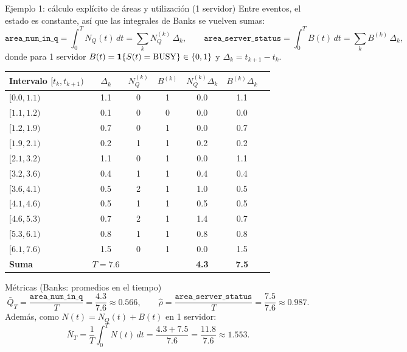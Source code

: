 \documentclass[aspectratio=1610, 9pt]{beamer}
\begin{document}
\begin{frame}{Ejemplo 1: cálculo explícito de áreas y utilización (1 servidor)}
\small
Entre eventos, el estado es constante, así que las integrales de Banks se vuelven sumas:
\[
\texttt{area\_num\_in\_q}=\int_0^T N_Q(t)\,dt=\sum_k N_Q^{(k)}\,\Delta_k,\qquad
\texttt{area\_server\_status}=\int_0^T B(t)\,dt=\sum_k B^{(k)}\,\Delta_k,
\]
donde para 1 servidor $B(t)=\mathbf{1}\{S(t)=\text{BUSY}\}\in\{0,1\}$ y $\Delta_k=t_{k+1}-t_k$.

\tiny
\setlength{\tabcolsep}{2.6pt}
\renewcommand{\arraystretch}{1.12}
\begin{table}
\centering
\begin{tabular}{@{}lcccccc@{}}
\toprule
Intervalo $[t_k,t_{k+1})$ & $\Delta_k$ & $N_Q^{(k)}$ & $B^{(k)}$ &
$N_Q^{(k)}\Delta_k$ & $B^{(k)}\Delta_k$\\
\midrule
$[0.0,1.1)$ & 1.1 & 0 & 1 & 0.0 & 1.1\\
$[1.1,1.2)$ & 0.1 & 0 & 0 & 0.0 & 0.0\\
$[1.2,1.9)$ & 0.7 & 0 & 1 & 0.0 & 0.7\\
$[1.9,2.1)$ & 0.2 & 1 & 1 & 0.2 & 0.2\\
$[2.1,3.2)$ & 1.1 & 0 & 1 & 0.0 & 1.1\\
$[3.2,3.6)$ & 0.4 & 1 & 1 & 0.4 & 0.4\\
$[3.6,4.1)$ & 0.5 & 2 & 1 & 1.0 & 0.5\\
$[4.1,4.6)$ & 0.5 & 1 & 1 & 0.5 & 0.5\\
$[4.6,5.3)$ & 0.7 & 2 & 1 & 1.4 & 0.7\\
$[5.3,6.1)$ & 0.8 & 1 & 1 & 0.8 & 0.8\\
$[6.1,7.6)$ & 1.5 & 0 & 1 & 0.0 & 1.5\\
\midrule
\textbf{Suma} & \textbf{$T=7.6$} &  &  & \textbf{4.3} & \textbf{7.5}\\
\bottomrule
\end{tabular}
\end{table}

\scriptsize
\begin{block}{Métricas (Banks: promedios en el tiempo)}
\[
\bar Q_T=\frac{\texttt{area\_num\_in\_q}}{T}=\frac{4.3}{7.6}\approx 0.566,
\qquad
\hat\rho=\frac{\texttt{area\_server\_status}}{T}=\frac{7.5}{7.6}\approx 0.987.
\]
Además, como $N(t)=N_Q(t)+B(t)$ en 1 servidor:
\[
\bar N_T=\frac{1}{T}\int_0^T N(t)\,dt=\frac{4.3+7.5}{7.6}=\frac{11.8}{7.6}\approx 1.553.
\]
\end{block}


\end{frame}
\end{document}
